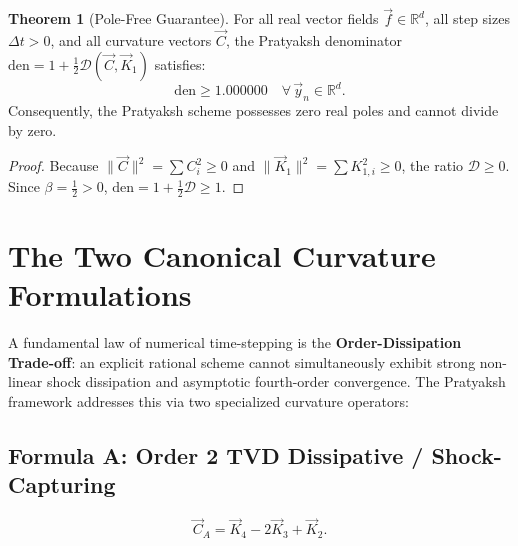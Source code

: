 \documentclass[11pt,a4paper]{article}
\theoremstyle{definition}
\newtheorem{theorem}{Theorem}
\begin{document}
\begin{theorem}[Pole-Free Guarantee]
For all real vector fields $\vec{f} \in \mathbb{R}^d$, all step sizes $\Delta t > 0$, and all curvature vectors $\vec{C}$, the Pratyaksh denominator $\text{den} = 1 + \frac{1}{2}\mathcal{D}(\vec{C}, \vec{K}_1)$ satisfies:
\begin{equation}
    \text{den} \ge 1.000000 \quad \forall \, \vec{y}_n \in \mathbb{R}^d.
\end{equation}
Consequently, the Pratyaksh scheme possesses zero real poles and cannot divide by zero.
\end{theorem}
\begin{proof}
Because $\|\vec{C}\|^2 = \sum C_i^2 \ge 0$ and $\|\vec{K}_1\|^2 = \sum K_{1,i}^2 \ge 0$, the ratio $\mathcal{D} \ge 0$. Since $\beta = \frac{1}{2} > 0$, $\text{den} = 1 + \frac{1}{2}\mathcal{D} \ge 1$.
\end{proof}


\section{The Two Canonical Curvature Formulations}

A fundamental law of numerical time-stepping is the \textbf{Order-Dissipation Trade-off}: an explicit rational scheme cannot simultaneously exhibit strong non-linear shock dissipation and asymptotic fourth-order convergence. The Pratyaksh framework addresses this via two specialized curvature operators:

\subsection{Formula A: Order 2 TVD Dissipative / Shock-Capturing}
\begin{equation}
    \vec{C}_A = \vec{K}_4 - 2\vec{K}_3 + \vec{K}_2.
    \label{eq:form_a}
\end{equation}
\end{document}
